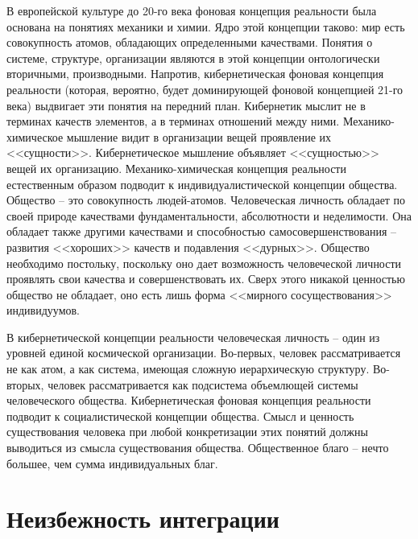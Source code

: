 \documentclass{book}
\begin{document}
В европейской культуре до 20-го века фоновая концепция реальности была основана на понятиях механики и химии. Ядро этой концепции таково: мир есть совокупность атомов, обладающих определенными качествами.  Понятия о системе, структуре, организации являются в этой концепции онтологически вторичными, производными. Напротив, кибернетическая фоновая концепция реальности (которая, вероятно, будет до­минирующей фоновой концепцией 21-го века) выдвигает эти понятия на передний план. Кибернетик мыслит не в терминах качеств  элементов, а в терминах отношений между ними. Механико-химическое мышление видит в организации вещей проявление их <<сущности>>. Кибернетическое мышление объяв­ляет <<сущностью>> вещей их организацию.
Механико-химическая концепция реальности естественным образом подводит к индивидуалистической концепции общест­ва. Общество -- это совокупность людей-атомов. Человеческая личность обладает по своей природе качествами фундаменталь­ности, абсолютности и неделимости. Она обладает также дру­гими качествами и способностью самосовершенствования -- развития <<хороших>> качеств и подавления <<дурных>>. Общест­во необходимо постольку, поскольку оно дает возможность человеческой личности проявлять свои качества и совершенст­вовать их. Сверх этого никакой ценностью общество не обла­дает, оно есть лишь форма <<мирного сосуществования>> инди­видуумов.

В кибернетической концепции реальности человеческая лич­ность -- один из уровней единой космической организации. Во-первых, человек рассматривается не как атом, а как систе­ма, имеющая сложную иерархическую структуру. Во-вторых, человек рассматривается как подсистема объемлющей систе­мы человеческого общества. Кибернетическая фоновая кон­цепция реальности подводит к социалистической концепции общества. Смысл и ценность существования человека при любой конкретизации этих понятий должны выводиться из смысла существования общества. Общественное благо -- нечто большее, чем сумма индивидуальных благ.

\section{Неизбежность интеграции}
\end{document}
